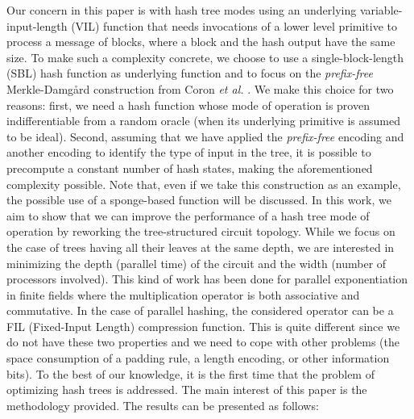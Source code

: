 \documentclass{llncs}
\begin{document}
Our concern in this paper is with hash tree modes using an underlying variable-input-length (VIL)
function that needs  invocations of a lower level primitive to process a message of  blocks, 
where a block and the hash output have the same size.
To make such a complexity concrete,
we choose to use a single-block-length (SBL) hash function as underlying function 
and to focus on the \emph{prefix-free} Merkle-Damg{\aa}rd construction from Coron \textit{et al.} \cite{CDMP05}. We make this choice for two reasons: 
first, we need a hash function whose mode of operation is proven indifferentiable from a random oracle (when its underlying primitive is assumed to be ideal).
Second, assuming that we have applied the \emph{prefix-free} encoding \cite{CDMP05} 
and another encoding \cite{BDPV09,BDPV14_Sak} to identify the type of input in the tree, it is possible to precompute a constant number of hash states,
making the aforementioned complexity possible.
Note that, even if we take this construction as an example, the possible use of a sponge-based function 
will be discussed.
In this work, we aim to show that we can improve
the performance of a hash tree mode of operation by reworking the tree-structured circuit topology.
While we focus on the case of trees having all their leaves at the same depth,
we are interested in minimizing the depth (parallel time)
of the circuit and the width (number of processors involved). This kind of work has been done for parallel 
exponentiation in finite fields \cite{Sti90,Gat91,AMV88a,LKPC05,WLLC06} where the multiplication operator is both associative and commutative.
In the case of parallel hashing, the considered operator can be a FIL (Fixed-Input Length) compression function. This is quite different since 
we do not have these two properties and we need to cope with other problems (the space consumption of a padding rule, a length encoding, 
or other information bits).
To the best of our knowledge, it is the first time that the problem of optimizing hash trees is addressed. The main interest of this paper is 
the methodology provided.
The results can be presented as follows:
\end{document}
